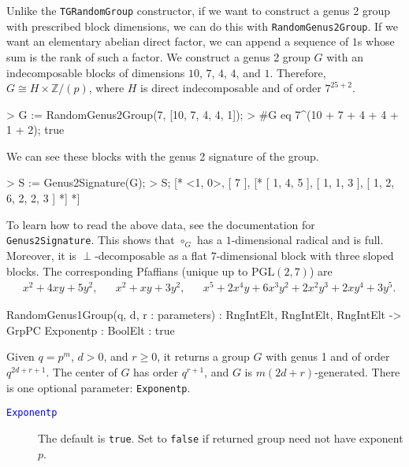 \documentclass{documentation}
\begin{document}
\begin{example}[PrescribedBlocks]
    Unlike the \texttt{TGRandomGroup} constructor, if we want to construct a genus 2 group with prescribed block dimensions, we can do this with \texttt{RandomGenus2Group}. If we want an elementary abelian direct factor, we can append a sequence of $1$s whose sum is the rank of such a factor. We construct a genus 2 group $G$ with an indecomposable blocks of dimensions $10$, $7$, $4$, $4$, and $1$. Therefore, $G\cong H\times \mathbb{Z}/(p)$, where $H$ is direct indecomposable and of order $7^{25+2}$. 
\begin{code}
> G := RandomGenus2Group(7, [10, 7, 4, 4, 1]);
> #G eq 7^(10 + 7 + 4 + 4 + 1 + 2);
true        
\end{code}

    We can see these blocks with the genus 2 signature of the group. 
\begin{code}
> S := Genus2Signature(G);
> S;
[* <1, 0>,
[ 7 ],
[*
[ 1, 4, 5 ],
[ 1, 1, 3 ],
[ 1, 2, 6, 2, 2, 3 ]
*]
*]    
\end{code}

To learn how to read the above data, see the documentation for \texttt{Genus2Signature}. This shows that $\circ_G$ has a $1$-dimensional radical and is full. Moreover, it is $\perp$-decomposable as a flat $7$-dimensional block with three sloped blocks. The corresponding Pfaffians (unique up to $\mathrm{PGL}(2, 7)$) are 
\begin{align*}
    & x^2 + 4xy + 5y^2, & & x^2 + xy + 3y^2, & & x^5 + 2x^4y + 6x^3y^2 + 2x^2y^3 + 2xy^4 + 3y^5.
\end{align*}
\end{example}

\begin{intrinsics}
RandomGenus1Group(q, d, r : parameters) : RngIntElt, RngIntElt, RngIntElt -> GrpPC
    Exponentp : BoolElt : true
\end{intrinsics}

Given $q=p^m$, $d>0$, and $r\geq 0$, it returns a group $G$ with genus 1 and of order $q^{2d+r+1}$.
The center of $G$ has order $q^{r+1}$, and $G$ is $m(2d+r)$-generated.
There is one optional parameter: \texttt{Exponentp}. 

\begin{description}
\item[\textcolor{blue}{\tt Exponentp}]
The default is \texttt{true}.
Set to \texttt{false} if returned group need not have exponent $p$.  
\end{description}
\end{document}
